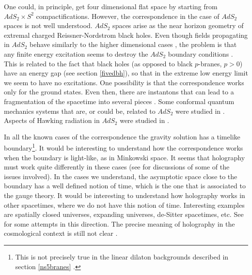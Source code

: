 One could, in principle, get four dimensional flat space by
starting from   $AdS_2\times
S^2$ compactifications.  However, the correspondence in the case of
$AdS_2$ spaces is not well understood. 
$AdS_2$ spaces 
arise as the near horizon geometry of extremal
charged Reissner-Nordstrom black holes. Even though fields propagating in 
$AdS_2$ behave similarly to  the higher dimensional cases 
\cite{Strominger:1999yg},
the problem is that any finite energy excitation seems to 
destroy the $AdS_2$ boundary conditions \cite{Maldacena:1999uz}. 
This is related to the fact that black holes (as opposed to black
$p$-branes, $p>0$) have an energy gap 
(see section \ref{fivedbh}), so that in the extreme low energy limit
we seem to have no excitations. 
One possibility is that the correspondence works only for the ground
states. Even then, there are instantons that can lead to a fragmentation
of the spacetime into several pieces 
\cite{Brill:1992rw}. 
Some conformal quantum mechanics systems that are, or 
could be,  related to 
$AdS_2$ were studied in
\cite{Kumar:1999fx,Kallosh:1999mi,Gibbons:1998fa,Townsend:1998qp}. 
Aspects of Hawking radiation in $AdS_2$ were studied in 
\cite{Spradlin:1999bn}.

In all the known cases of the correspondence the gravity solution 
has a timelike boundary\footnote{This is not precisely true in the
linear dilaton backgrounds described in section \ref{ns5branes}
\cite{Aharony:1998ub}.}. It would be interesting to understand how the
correspondence works when the boundary is light-like, as in Minkowski
space. It seems that holography must work quite differently in these
cases (see \cite{Aharony:1999tt,Hashimoto:1999yc} for discussions of
some of the issues involved).
In the cases we understand, the asymptotic space close to the boundary 
has a well defined notion of time, which is the one that is associated
to the gauge theory.  It would be interesting to understand how 
holography works in other spacetimes, where we do not have this
notion of time. Interesting examples are spatially closed universes, 
expanding universes, de-Sitter spacetimes, etc. See
 \cite{Horowitz:1998xk,Hull:1998vg,Hull:1998ym,Hull:1998fh}
 for some
attempts in this direction.
The precise meaning of holography in the cosmological context is still
not clear \cite{Fischler:1998st,Bak:1998vj,%
Dawid:1998ip,Rama:1998pk,Easther:1999gk,%
Bak:1999hd,Kaloper:1999tt}.

